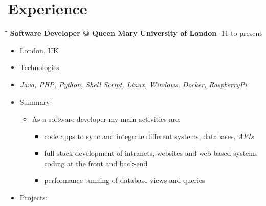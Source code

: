 \documentclass[margin]{res}
\begin{document}
\section{Experience}
\begin{tabbing}
	\hspace{2.3in}\= \hspace{1.7in}\= \kill %
	\textbf{Software Developer @ Queen Mary University of London} \>-11 to present
\end{tabbing}
\begin{itemize}
\item
  London, UK
\item
  Technologies:
\item
  \emph{Java, PHP, Python, Shell Script, Linux, Windows, Docker,
  RaspberryPi}
\item
  Summary:

  \begin{itemize}
  
  \item
    As a software developer my main activities are:

    \begin{itemize}
    
    \item
      code apps to sync and integrate different systems, databases,
      \emph{APIs}
    \item
      full-stack development of intranets, websites and web based
      systems coding at the front and back-end
    \item
      performance tunning of database views and queries
    \end{itemize}
  \end{itemize}
\item
  Projects:


\end{itemize}
\end{document}
